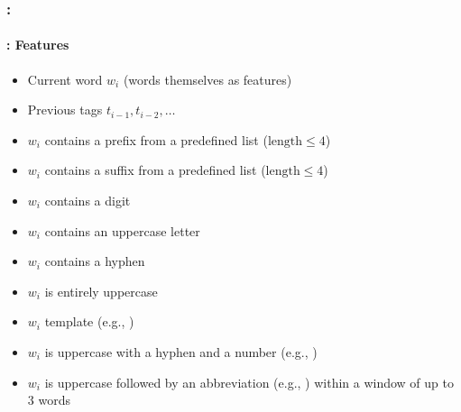 \documentclass[xcolor=table]{beamer}
\begin{document}
\begin{frame}
	\frametitle{\insertshortsubtitle: \insertsection}
	\framesubtitle{\insertsubsection: Features}

	\begin{itemize}
		\item Current word $w_i$ (words themselves as features)
		\item Previous tags $t_{i-1}, t_{i-2}, \dots$
		\item $w_i$ contains a prefix from a predefined list ($\text{length} \le 4$)
		\item $w_i$ contains a suffix from a predefined list ($\text{length} \le 4$)
		\item $w_i$ contains a digit
		\item $w_i$ contains an uppercase letter
		\item $w_i$ contains a hyphen
		\item $w_i$ is entirely uppercase
		\item $w_i$ template (e.g., )
		\item $w_i$ is uppercase with a hyphen and a number (e.g., )
		\item $w_i$ is uppercase followed by an abbreviation (e.g., ) within a window of up to 3 words
	\end{itemize}

\end{frame}

%	
%	
\end{document}
